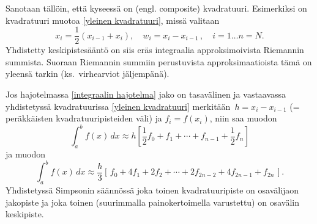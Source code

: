 Sanotaan tällöin, että kyseessä on  (engl. composite) kvadratuuri.
%
Esimerkiksi  on kvadratuuri muotoa \eqref{yleinen kvadratuuri},
missä valitaan
\[
x_i=\frac{1}{2}(x_{i-1}+x_i), \quad w_i=x_{i}-x_{i-1}\,, \quad i=1 \ldots n=N.
\]
Yhdistetty keskipistesääntö on siis eräs integraalia approksimoivista Riemannin summista.
Suoraan Riemannin summiin perustuvista approksimaatioista tämä on yleensä tarkin 
(ks.\ virhearviot jäljempänä).

Jos hajotelmassa \eqref{integraalin hajotelma} jako on tasavälinen ja vastaavassa yhdistetyssä
kvadratuurissa \eqref{yleinen kvadratuuri} merkitään $\,h=x_i-x_{i-1}$ (= peräkkäisten
kvadratuuripisteiden väli) ja $f_i=f(x_i)$, niin  saa muodon
%
\[
\int_a^b f(x)\,dx\approx h\left[\frac{1}{2}f_0+f_1+\cdots + f_{n-1}+\frac{1}{2}f_n\right]
\]
ja  muodon
\[
\int_a^b f(x)\,dx
       \approx \frac{h}{3}\left[\,f_0+4f_1+2f_2+\cdots +2f_{2n-2}+ 4f_{2n-1}+f_{2n}\,\right].
\]
Yhdistetyssä Simpsonin säännössä joka toinen kvadratuuripiste on osavälijaon jakopiste ja joka
toinen (suurimmalla painokertoimella varustettu) on osavälin keskipiste. 

